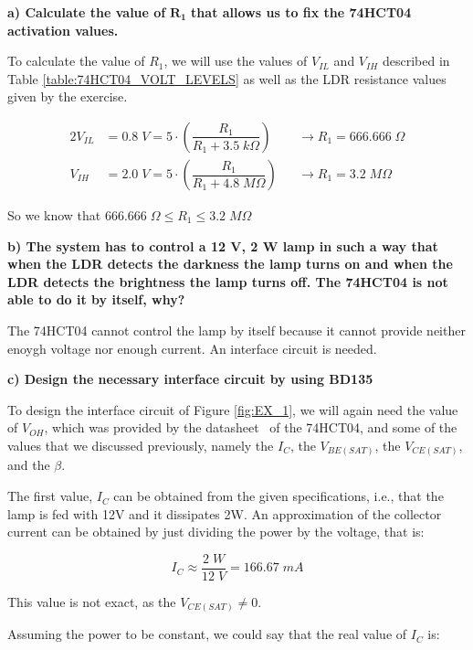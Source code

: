 \textbf{a) Calculate the value of} $\mathbf{R_1}$ \textbf{that allows us to fix the 74HCT04 activation values.}\medskip

To calculate the value of $R_1$, we will use the values of $V_{IL}$ and $V_{IH}$ described in Table \ref{table:74HCT04_VOLT_LEVELS} as well as the LDR resistance values given by the exercise.\medskip

\vspace{-0.5cm}

\begin{alignat*}{2}
    V_{IL} &= 0.8 \; V = 5 \cdot \left( \dfrac{R_1}{R_1 + 3.5 \; k\Omega} \right)  &&\rightarrow R_1 = 666.666 \; \Omega \\[7pt]
    V_{IH} &= 2.0 \; V = 5 \cdot \left( \dfrac{R_1}{R_1 + 4.8 \; M\Omega} \right)  &&\rightarrow R_1 = 3.2  \; M\Omega
\end{alignat*}

So we know that $ 666.666 \; \Omega \leq R_1 \leq 3.2 \; M\Omega$ \bigskip

\textbf{b) The system has to control a 12 V, 2 W lamp in such a way that when the LDR detects the darkness the lamp turns on and when the LDR detects the brightness the lamp turns off. The 74HCT04 is not able to do it by itself, why?}\medskip

The 74HCT04 cannot control the lamp by itself because it cannot provide neither enoygh voltage nor enough current. An interface circuit is needed. \bigskip

\textbf{c) Design the necessary interface circuit by using BD135}\medskip

To design the interface circuit of Figure \ref{fig:EX_1}, we will again need the value of $V_{OH}$, which was provided by the datasheet~\autocite{74HCT04} of the 74HCT04, and some of the values that we discussed previously, namely the $I_C$, the $V_{BE(SAT)}$, the $V_{CE(SAT)}$, and the $\beta$.\medskip

The first value, $I_C$ can be obtained from the given specifications, i.e., that the lamp is fed with 12V and it dissipates 2W. An approximation of the collector current can be obtained by just dividing the power by the voltage, that is:

\begin{equation*}
    I_C \approx \frac{2 \; W}{12 \; V} = 166.67 \; mA
\end{equation*}


This value is not exact, as the $V_{CE(SAT)} \neq 0$.\medskip

Assuming the power to be constant, we could say that the real value of $I_C$ is:

